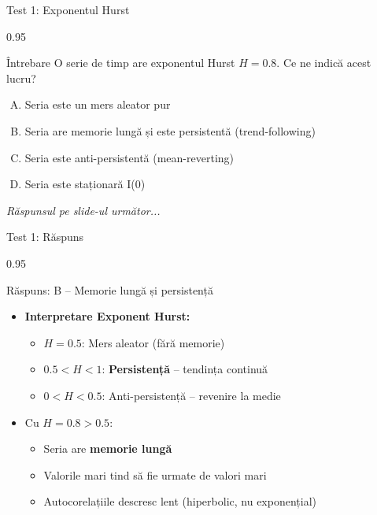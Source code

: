 \documentclass[9pt, aspectratio=169, t]{beamer}
\begin{document}
\begin{frame}{Test 1: Exponentul Hurst}
    \begin{cminipage}{0.95\textwidth}
    \begin{alertblock}{Întrebare}
        O serie de timp are exponentul Hurst $H = 0.8$. Ce ne indică acest lucru?
    \end{alertblock}

    \vspace{0.3cm}

    \begin{enumerate}[A)]\setlength{\itemsep}{0pt}
        \item Seria este un mers aleator pur
        \item Seria are memorie lungă și este persistentă (trend-following)
        \item Seria este anti-persistentă (mean-reverting)
        \item Seria este staționară I(0)
    \end{enumerate}

    \vspace{0.5cm}
    \begin{flushright}\textit{Răspunsul pe slide-ul următor...}\end{flushright}
    \end{cminipage}
\end{frame}

\begin{frame}{Test 1: Răspuns}
    \begin{cminipage}{0.95\textwidth}
    \begin{exampleblock}{Răspuns: B -- Memorie lungă și persistență}
        \begin{itemize}\setlength{\itemsep}{0pt}
            \item \textbf{Interpretare Exponent Hurst:}
            \begin{itemize}\setlength{\itemsep}{0pt}
                \item $H = 0.5$: Mers aleator (fără memorie)
                \item $0.5 < H < 1$: \textbf{Persistență} -- tendința continuă
                \item $0 < H < 0.5$: Anti-persistență -- revenire la medie
            \end{itemize}
            \item Cu $H = 0.8 > 0.5$:
            \begin{itemize}\setlength{\itemsep}{0pt}
                \item Seria are \textbf{memorie lungă}
                \item Valorile mari tind să fie urmate de valori mari
                \item Autocorelațiile descresc lent (hiperbolic, nu exponențial)
            \end{itemize}
        \end{itemize}
    \end{exampleblock}
    \end{cminipage}
\end{frame}
\end{document}
